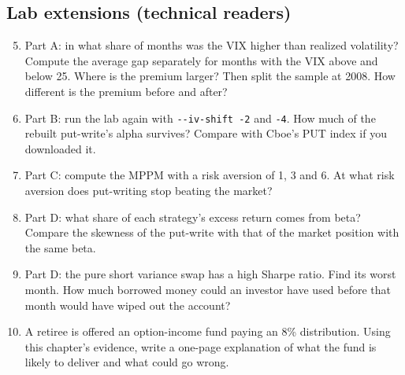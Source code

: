 \subsection*{Lab extensions (technical readers)}

\begin{enumerate}
  \setcounter{enumi}{4}
  \item Part A: in what share of months was the VIX higher than realized volatility? Compute the average gap separately for months with the VIX above and below 25. Where is the premium larger? Then split the sample at 2008. How different is the premium before and after?
  \item Part B: run the lab again with \texttt{-{}-iv-shift -2} and \texttt{-4}. How much of the rebuilt put-write's alpha survives? Compare with Cboe's PUT index if you downloaded it.
  \item Part C: compute the MPPM with a risk aversion of 1, 3 and 6. At what risk aversion does put-writing stop beating the market?
  \item Part D: what share of each strategy's excess return comes from beta? Compare the skewness of the put-write with that of the market position with the same beta.
  \item Part D: the pure short variance swap has a high Sharpe ratio. Find its worst month. How much borrowed money could an investor have used before that month would have wiped out the account?
  \item A retiree is offered an option-income fund paying an 8\% distribution. Using this chapter's evidence, write a one-page explanation of what the fund is likely to deliver and what could go wrong.
\end{enumerate}
